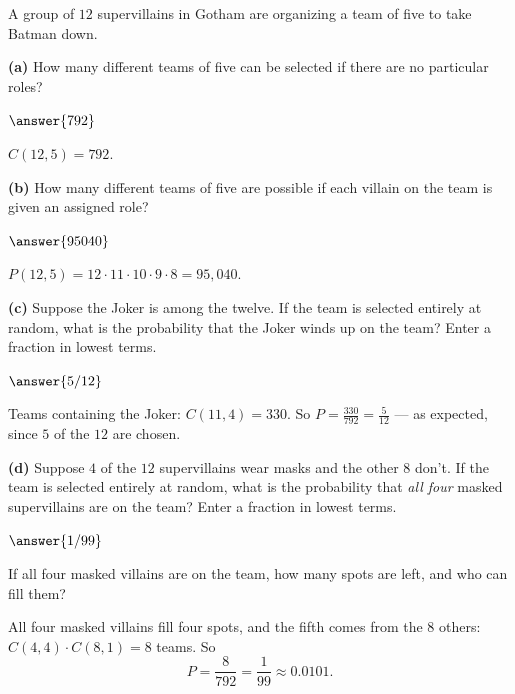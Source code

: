 \documentclass[12pt]{ximera}
\begin{document}
\begin{problem}
A group of $12$ supervillains in Gotham are organizing a team of five to take Batman
down.

\begin{prompt}
\textbf{(a)} How many different teams of five can be selected if there are no
particular roles?

$\answer{792}$

\begin{feedback}
$C(12,5)=792$.
\end{feedback}
\end{prompt}

\begin{prompt}
\textbf{(b)} How many different teams of five are possible if each villain on the team
is given an assigned role?

$\answer{95040}$

\begin{feedback}
$P(12,5)=12\cdot 11\cdot 10\cdot 9\cdot 8=95{,}040$.
\end{feedback}
\end{prompt}

\begin{prompt}
\textbf{(c)} Suppose the Joker is among the twelve. If the team is selected entirely at
random, what is the probability that the Joker winds up on the team? Enter a fraction in
lowest terms.

$\answer{5/12}$

\begin{feedback}
Teams containing the Joker: $C(11,4)=330$. So
$P=\frac{330}{792}=\frac{5}{12}$ --- as expected, since $5$ of the $12$ are chosen.
\end{feedback}
\end{prompt}

\begin{prompt}
\textbf{(d)} Suppose $4$ of the $12$ supervillains wear masks and the other $8$ don't. If
the team is selected entirely at random, what is the probability that \emph{all four}
masked supervillains are on the team? Enter a fraction in lowest terms.

$\answer{1/99}$

\begin{hint}
If all four masked villains are on the team, how many spots are left, and who can fill
them?
\end{hint}

\begin{feedback}
All four masked villains fill four spots, and the fifth comes from the $8$ others:
$C(4,4)\cdot C(8,1)=8$ teams. So
\[ P=\frac{8}{792}=\frac{1}{99}\approx 0.0101. \]
\end{feedback}
\end{prompt}
\end{problem}
\end{document}
